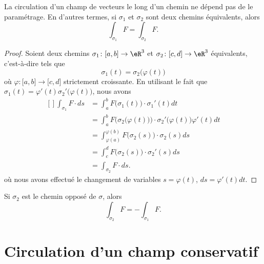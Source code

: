 \begin{proposition}
    La circulation d'un champ de vecteurs le long d'un chemin ne dépend pas de le paramétrage. En d'autres termes, si $\sigma_1$ et $\sigma_2$ sont deux chemins équivalents, alors
    \begin{equation}
        \int_{\sigma_1}F=\int_{\sigma_2}F.
    \end{equation}
\end{proposition}

\begin{proof}
    Soient deux chemins $\sigma_1\colon \mathopen[ a , b \mathclose]\to \eR^3$ et $\sigma_2\colon \mathopen[ c , d \mathclose]\to \eR^3$ équivalents, c'est-à-dire tels que
    \begin{equation}
        \sigma_1(t)=\sigma_2\big( \varphi(t) \big)
    \end{equation}
    où $\varphi\colon \mathopen[ a , b \mathclose]\to \mathopen[ c , d \mathclose]$ strictement croissante. En utilisant le fait que $\sigma_1(t)=\varphi'(t)\sigma_2'\big( \varphi(t) \big)$, nous avons
    \begin{equation}
        \begin{aligned}[]
            \int_{\sigma_1}F\cdot ds&=\int_a^bF\big( \sigma_1(t) \big)\cdot\sigma_1'(t)dt\\
            &=\int_a^bF\Big( \sigma_2\big( \varphi(t) \big) \Big)\cdot\sigma_2'\big( \varphi(t) \big)\varphi'(t)dt\\
            &=\int_{\varphi(a)}^{\varphi(b)}F\big( \sigma_2(s) \big)\cdot\sigma_2(s)ds\\
            &=\int_c^dF\big( \sigma_2(s) \big)\cdot \sigma_2'(s)ds\\
            &=\int_{\sigma_2}F\cdot ds.
        \end{aligned}
    \end{equation}
    où nous avons effectué le changement de variables $s=\varphi(t)$, $ds=\varphi'(t)dt$.
\end{proof}

\begin{remark}
    Si $\sigma_2$ est le chemin opposé de $\sigma$, alors
    \begin{equation}
        \int_{\sigma_2}F=-\int_{\sigma_1}F.
    \end{equation}
\end{remark}

\section{Circulation d'un champ conservatif}


